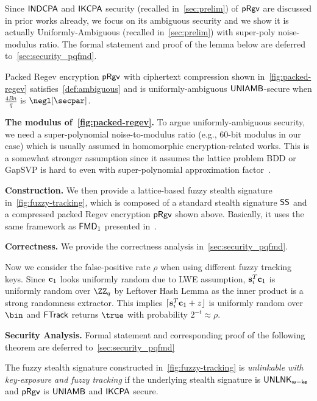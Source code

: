 Since $\mathsf{INDCPA}$ and $\mathsf{IKCPA}$ security (recalled in~\cref{sec:prelim}) of $\mathsf{pRgv}$ are discussed in prior works already, we focus on its ambiguous security and we show it is actually Uniformly-Ambiguous (recalled in~\cref{sec:prelim}) with super-poly noise-modulus ratio. The formal statement and proof of the lemma below are deferred to~\cref{sec:security_pqfmd}.
\begin{lemma}
\label{lem:ambiguous-abs}
Packed Regev encryption $\mathsf{pRgv}$ with ciphertext compression shown in~\cref{fig:packed-regev} satisfies~\cref{def:ambiguous} and is uniformly-ambiguous $\mathsf{UNIAMB}$-secure when $\frac{4Bn}{q}$ is $\negl[\secpar]$.
\end{lemma}

\smallskip\noindent\textbf{The modulus of~\cref{fig:packed-regev}.}
To argue uniformly-ambiguous security, we need a super-polynomial noise-to-modulus ratio (e.g., 60-bit modulus in our case) which is usually assumed in homomorphic encryption-related works. This is a somewhat stronger assumption since it assumes the lattice problem BDD or GapSVP is hard to even with super-polynomial approximation factor~\cite{STOC:Regev05}.

\smallskip\noindent\textbf{Construction.}
We then provide a lattice-based fuzzy stealth signature in~\cref{fig:fuzzy-tracking}, which is composed of a standard stealth signature $\mathsf{SS}$ and a compressed packed Regev encryption $\mathsf{pRgv}$ shown above. Basically, it uses the same framework as $\mathsf{FMD}_1$ presented in~\cite{CCS:BLMG21}. 

\smallskip\noindent\textbf{Correctness.} We provide the correctness analysis in~\cref{sec:security_pqfmd}.




Now we consider the false-positive rate $\rho$ when using different fuzzy tracking keys. Since $\mathbf{c}_1$ looks uniformly random due to LWE assumption, $\mathbf{s}_i^T\mathbf{c}_1$ is uniformly random over $\ZZ_q$ by Leftover Hash Lemma as the inner product is a strong randomness extractor. This implies $\lceil\mathbf{s}_i^T\mathbf{c}_1+z\rfloor$ is uniformly random over $\bin$ and $\mathsf{FTrack}$ returns $\true$ with probability $2^{-t}\approx \rho$.

\smallskip\noindent\textbf{Security Analysis.}
 Formal statement and corresponding proof of the following theorem are deferred to~\cref{sec:security_pqfmd}

\begin{theorem}[informal]
\label{thm:pqfmd-unlink-abs}
The fuzzy stealth signature constructed in~\cref{fig:fuzzy-tracking} is \emph{unlinkable with key-exposure and fuzzy tracking} if the underlying stealth signature is $\mathsf{UNLNK}_\mathsf{w-ke}$ and $\mathsf{pRgv}$ is $\mathsf{UNIAMB}$ and $\mathsf{IKCPA}$ secure. 
\end{theorem}


